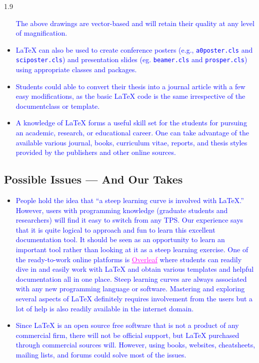 \documentclass[phd]{ndsu-thesis-2022}
\newcommand\myspacing{1.9} %
\newcommand\italk[1]{\textcolor{blue}{#1}}  %
\newcommand\lx{\LaTeX\xspace}
\newcommand\vb[1]{\textcolor{blue}{\texttt{#1}}}%
\begin{document}
\begin{spacing}{\myspacing}
\begin{itemize}[leftmargin=*, itemsep=0pt, parsep=3pt]
\noindent \italk{The above drawings are vector-based and will retain their quality at any level of magnification.}

\item \italk{\lx can also be used to create conference posters (e.g., \vb{a0poster.cls} and \vb{sciposter.cls}) and presentation slides (eg. \vb{beamer.cls} and \vb{prosper.cls}) using appropriate classes and packages.} 

\item \italk{Students could able to convert their thesis into a journal article with a few easy modifications, as the basic \lx code is the same irrespective of the documentclass or template.}

\item \italk{A knowledge of \lx forms a useful skill set for the students for pursuing an academic, research, or educational career. One can take advantage of the available various journal, books, curriculum vitae, reports, and thesis styles provided by the publishers and other online sources.} 

\end{itemize}

\subsection{Possible Issues --- And Our Takes}
\begin{itemize}[leftmargin=*, itemsep=0pt, parsep=3pt] 
\item \italk{People hold the idea that ``a steep learning curve is involved with \lx.'' However, users with programming knowledge (graduate students and researchers) will find it easy to switch from any TPS. Our experience says that it is quite logical to approach and fun to learn this excellent documentation tool. It should be seen as an opportunity to learn an important tool rather than looking at it as a steep learning exercise. One of the ready-to-work online platforms is \href{https://www.overleaf.com/login}{\textcolor{magenta}{\underline{Overleaf}}} where students can readily dive in and easily work with \lx and obtain various templates and helpful documentation all in one place. Steep learning curves are always associated with any new programming language or software. Mastering and exploring several aspects of \lx definitely requires involvement from the users but a lot of help is also readily available in the internet domain.}   

\item \italk{Since \lx is an open source free software that is not a product of any commercial firm, there will not be official support, but \lx purchased through commercial sources will. However, using books, websites, cheatsheets, mailing lists, and forums could solve most of the issues.} 


\end{itemize}
\end{spacing}
\end{document}
